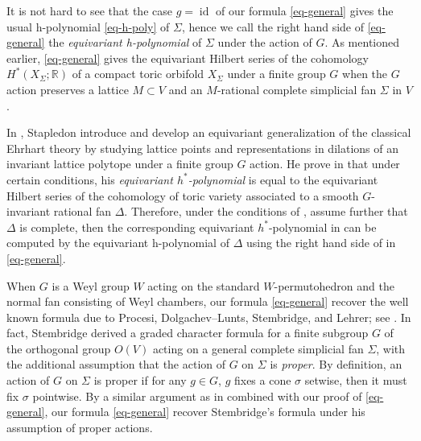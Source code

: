 \documentclass{amsart}
\theoremstyle{definition}
\theoremstyle{remark}
\numberwithin{equation}{section}
\begin{document}
It is not hard to see that the case $g=\operatorname{id}$ of our formula \eqref{eq-general} gives the usual h-polynomial \eqref{eq-h-poly} of $\Sigma$, hence we call the right hand side of \eqref{eq-general} the \emph{equivariant h-polynomial} of $\Sigma$ under the action of $G$. As mentioned earlier, \eqref{eq-general} gives the equivariant Hilbert series of the cohomology $H^*\left(X_{\Sigma}; \mathbb{R}\right)$ of a compact toric orbifold $X_{\Sigma}$ under a finite group $G$ when the $G$  action preserves a lattice $M \subset V$ and an $M$-rational complete simplicial fan $\Sigma$ in $V$. 

In \cite{stapledon2011equivariant}, Stapledon introduce and develop an equivariant generalization of the classical Ehrhart theory by studying lattice points and representations in dilations of an invariant lattice polytope under a finite group $G$ action. He prove in \cite[Proposition 8.1]{stapledon2011equivariant} that under certain conditions, his \emph{equivariant $h^*$-polynomial} is equal to the equivariant Hilbert series of the cohomology of toric variety associated to a smooth $G$-invariant rational fan $\Delta$. Therefore, under the conditions of \cite[Proposition 8.1]{stapledon2011equivariant}, assume further that $\Delta$ is complete, then the corresponding equivariant $h^*$-polynomial in \cite[Proposition 8.1]{stapledon2011equivariant} can be computed by the equivariant h-polynomial of $\Delta$ using the right hand side of in \eqref{eq-general}.

When $G$ is a Weyl group $W$ acting on the standard $W$-permutohedron and the normal fan consisting of Weyl chambers, our formula \eqref{eq-general} recover the well known formula due to Procesi\cite{Procesi90}, Dolgachev--Lunts\cite{dolgachev1994character}, Stembridge\cite{stembridge1994some}, and Lehrer\cite{lehrer2008rational}; see \cite[Theorem 1.1]{lehrer2008rational}. In fact, Stembridge\cite[Theorem 1.4]{stembridge1994some} derived a graded character formula for a finite subgroup $G$ of the orthogonal group $O(V)$ acting on a general complete simplicial fan $\Sigma$, with the additional assumption that the action of $G$ on $\Sigma$ is \emph{proper}. By definition, an action of $G$ on $\Sigma$ is proper if for any $g \in G$, $g$ fixes a cone $\sigma$ setwise, then it must fix $\sigma$ pointwise. By a similar argument as in \cite[Appendix A]{lehrer2008rational} combined with our proof of \eqref{eq-general}, our formula \eqref{eq-general} recover Stembridge's formula under his assumption of proper actions.
\end{document}
